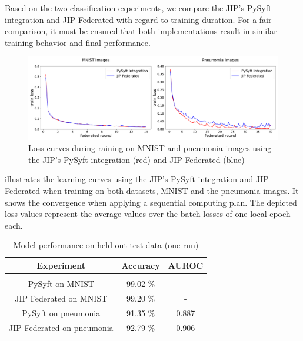 Based on the two classification experiments, we compare the JIP's PySyft integration and JIP Federated with regard to training duration. For a fair comparison, it must be ensured that both implementations result in similar training behavior and final performance.

\begin{figure}[htbp]
    \centerline{\includegraphics[width=1.0\textwidth]{1_Figures/RuntimeExperiments_horizontal.pdf}}
    \caption[Loss curves during training on MNIST and pneunomia images]{Loss curves during raining on MNIST and pneumonia images using the JIP's PySyft integration (red) and JIP Federated (blue)}
\label{fig:RuntimeExp}
\end{figure}

 illustrates the learning curves using the JIP's PySyft integration and JIP Federated when training on both datasets, MNIST and the pneumonia images. It shows the convergence when applying a sequential computing plan. The depicted loss values represent the average values over the batch losses of one local epoch each.

\begin{table}[htbp]
  \centering
  \begin{tabular}{ccc}
  Experiment & Accuracy & AUROC \\
  \hline \\[-2.5ex] %
  PySyft on MNIST               & 99.02 \% & - \\
  JIP Federated on MNIST        & 99.20 \% & - \\
  PySyft on pneumonia           & 91.35 \% & 0.887 \\
  JIP Federated on pneumonia    & 92.79 \% & 0.906 \\
 \end{tabular}
 \caption[Model performance on held out test data]{Model performance on held out test data (one run)}
 \label{tab:Performance}
\end{table}

